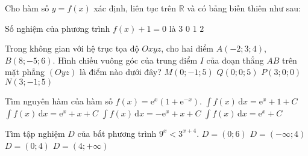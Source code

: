 \begin{ex}%
Cho hàm số $y=f(x)$ xác định, liên tục trên $\mathbb{R}$ và có bảng biến thiên như sau:
\begin{center}
\end{center}
Số nghiệm của phương trình $f(x)+1=0$ là
\choice
{$3$}
{$0$}
{$1$}
{\True $2$}
\end{ex}

\begin{ex}%
Trong không gian với hệ trục tọa độ $Oxyz$, cho hai điểm $A(-2;3;4)$, $B(8;-5;6)$. Hình chiếu vuông góc của trung điểm $I$ của đoạn thẳng $AB$ trên mặt phẳng $(Oyz)$ là điểm nào dưới đây?
\choice
{\True $M(0;-1;5)$}
{$Q(0;0;5)$}
{$P(3;0;0)$}
{$N(3;-1;5)$}
\end{ex}

\begin{ex}%
Tìm nguyên hàm của hàm số $f(x)=\mathrm{e}^x(1+\mathrm{e}^{-x})$.
\choice
{$\displaystyle\int f(x)\mathrm{\,d}x=\mathrm{e}^x+1+C$}
{\True $\displaystyle\int f(x)\mathrm{\,d}x=\mathrm{e}^x+x+C$}
{$\displaystyle\int f(x)\mathrm{\,d}x=-\mathrm{e}^x+x+C$}
{$\displaystyle\int f(x)\mathrm{\,d}x=\mathrm{e}^x+C$}
\end{ex}

\begin{ex}%
Tìm tập nghiệm $D$ của bất phương trình $9^x<3^{x+4}$.
\choice
{$D=(0;6)$}
{\True $D=(-\infty;4)$}
{$D=(0;4)$}
{$D=(4;+\infty)$}
\end{ex}

